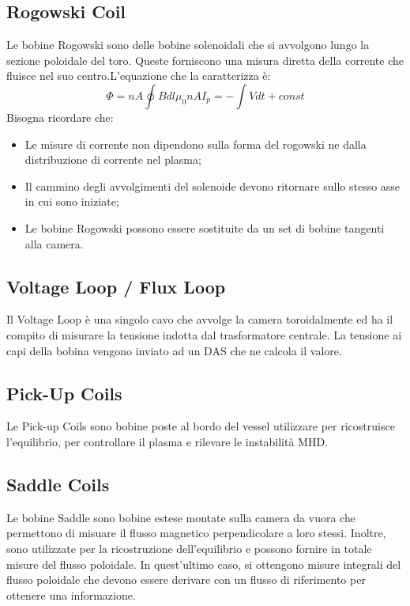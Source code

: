 \documentclass{article}
\begin{document}
\subsection{Rogowski Coil}
Le bobine Rogowski sono delle bobine solenoidali che si avvolgono lungo la sezione poloidale del toro. Queste forniscono una misura diretta della corrente che fluisce nel suo centro.\newline L'equazione che la caratterizza è:\begin{equation}
    \Phi = nA \oint B dl \mu_{0}nAI_p=-\int V dt+const
\end{equation}
Bisogna ricordare che:
\begin{itemize}
    \item Le misure di corrente non dipendono sulla forma del rogowski ne dalla distribuzione di corrente nel plasma;
    \item Il cammino degli avvolgimenti del solenoide devono ritornare sullo stesso asse in cui sono iniziate;
    \item Le bobine Rogowski possono essere sostituite da un set di bobine tangenti alla camera.
\end{itemize}
\subsection{Voltage Loop / Flux Loop}
Il Voltage Loop è una singolo cavo che avvolge la camera toroidalmente ed ha il compito di misurare la tensione indotta dal trasformatore centrale. La tensione ai capi della bobina vengono inviato ad un DAS che ne calcola il valore.
\subsection{Pick-Up Coils}
Le Pick-up Coils sono bobine poste al bordo del vessel utilizzare per ricostruisce l'equilibrio, per controllare il plasma e rilevare le instabilità MHD.%
\subsection{Saddle Coils}
Le bobine Saddle sono bobine estese montate sulla camera da vuora che permettono di misuare il flusso magnetico perpendicolare a loro stessi. Inoltre, sono utilizzate per la ricostruzione dell'equilibrio e possono fornire in totale misure del flusso poloidale. In quest'ultimo caso, si ottengono misure integrali del flusso poloidale che devono essere derivare con un flusso di riferimento per ottenere una informazione.
\end{document}
